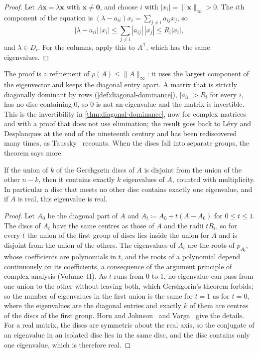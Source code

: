 \begin{proof}
Let $A\mathbf x=\lambda\mathbf x$ with $\mathbf x\ne\mathbf 0$, and choose $i$ with $|x_i|=\|\mathbf x\|_\infty>0$. The $i$th component of the equation is $(\lambda-a_{ii})x_i=\sum_{j\ne i}a_{ij}x_j$, so
\[
|\lambda-a_{ii}|\,|x_i|\le\sum_{j\ne i}|a_{ij}|\,|x_j|\le R_i|x_i| ,
\]
and $\lambda\in D_i$. For the columns, apply this to $A^{\mathsf T}$, which has the same eigenvalues.
\end{proof}

The proof is a refinement of $\rho(A)\le\|A\|_\infty$: it uses the largest component of the eigenvector and keeps the diagonal entry apart. A matrix that is strictly diagonally dominant by rows (\cref{def:diagonal-dominance}), $|a_{ii}|>R_i$ for every $i$, has no disc containing $0$, so $0$ is not an eigenvalue and the matrix is invertible. This is the invertibility in \cref{thm:diagonal-dominance}, now for complex matrices and with a proof that does not use elimination; the result goes back to L\'evy and Desplanques at the end of the nineteenth century and has been rediscovered many times, as Taussky~\cite{taussky1949} recounts. When the discs fall into separate groups, the theorem says more.

\begin{theorem}
\label{thm:gershgorin-separated}
If the union of $k$ of the Gershgorin discs of $A$ is disjoint from the union of the other $n-k$, then it contains exactly $k$ eigenvalues of $A$, counted with multiplicity. In particular a disc that meets no other disc contains exactly one eigenvalue, and if $A$ is real, this eigenvalue is real.
\end{theorem}

\begin{proof}
Let $A_0$ be the diagonal part of $A$ and $A_t\coloneqq A_0+t(A-A_0)$ for $0\le t\le1$. The discs of $A_t$ have the same centres as those of $A$ and the radii $tR_i$, so for every $t$ the union of the first group of discs lies inside the union for $A$ and is disjoint from the union of the others. The eigenvalues of $A_t$ are the roots of $p_{A_t}$, whose coefficients are polynomials in $t$, and the roots of a polynomial depend continuously on its coefficients, a consequence of the argument principle of complex analysis (Volume~II). As $t$ runs from $0$ to $1$, no eigenvalue can pass from one union to the other without leaving both, which Gershgorin's theorem forbids; so the number of eigenvalues in the first union is the same for $t=1$ as for $t=0$, where the eigenvalues are the diagonal entries and exactly $k$ of them are centres of the discs of the first group. Horn and Johnson~\cite[Sect.~6.1]{horn2013} and Varga~\cite{varga2004} give the details. For a real matrix, the discs are symmetric about the real axis, so the conjugate of an eigenvalue in an isolated disc lies in the same disc, and the disc contains only one eigenvalue, which is therefore real.
\end{proof}

